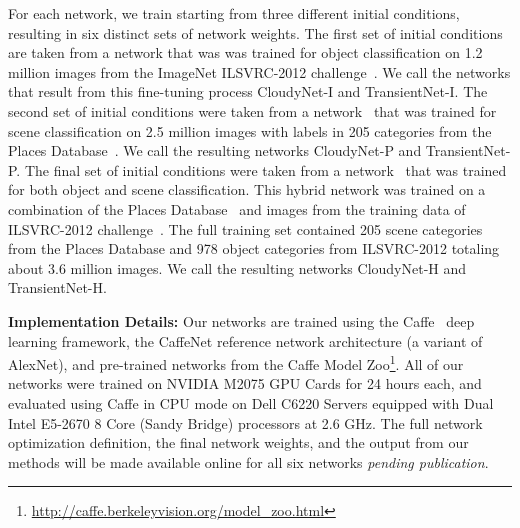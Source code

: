 \documentclass[10pt,twocolumn,letterpaper]{article}
\newcommand{\todo}[1]{\textcolor{red}{todo: {\em #1}}}
\begin{document}
For each network, we train starting from three different initial conditions,
resulting in six distinct sets of network weights. The first set of initial
conditions are taken from a network that was was trained for object
classification on 1.2 million images from the ImageNet ILSVRC-2012
challenge~\cite{ILSVRCarxiv14}.  We call the networks that result from this
fine-tuning process CloudyNet-I and TransientNet-I.  The second set of initial
conditions were taken from a network~\cite{zhou2014places} that was trained for
scene classification on 2.5 million images with labels in 205 categories from
the Places Database~\cite{zhou2014places}. We call the resulting networks
CloudyNet-P and TransientNet-P.  The final set of initial conditions were taken
from a network~\cite{zhou2014places} that was trained for both object and scene
classification.  This hybrid network was trained on a combination of the Places
Database~\cite{zhou2014places} and images from the training data of ILSVRC-2012
challenge~\cite{ILSVRCarxiv14}.  The full training set contained 205 scene
categories from the Places Database and 978 object categories from ILSVRC-2012
totaling about 3.6 million images.  We call the resulting networks CloudyNet-H
and TransientNet-H.

%

\textbf{Implementation Details:} Our networks are trained using the
Caffe~\cite{caffe14} deep learning framework, the CaffeNet reference network
architecture (a variant of AlexNet), and pre-trained networks
from the Caffe Model
Zoo\footnote{\url{http://caffe.berkeleyvision.org/model_zoo.html}}.
All of our networks were trained on NVIDIA M2075 GPU Cards for 24
hours each, and evaluated using Caffe in CPU mode on Dell C6220
Servers equipped with Dual Intel E5-2670 8 Core (Sandy Bridge)
processors at 2.6 GHz.  The full network optimization definition, the
final network weights, and the output from our methods will be made
available online for all six networks \emph{pending publication}.
\end{document}
